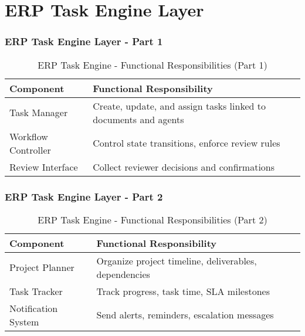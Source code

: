 \section{ERP Task Engine Layer}

\begin{frame}
    \frametitle{ERP Task Engine Layer - Part 1}
    \begin{table}[h!]
\centering
\renewcommand{\arraystretch}{1.2}
\begin{tabular}{|p{3cm}|p{7cm}|}
\hline
\textbf{Component} & \textbf{Functional Responsibility} \\
\hline
Task Manager & Create, update, and assign tasks linked to documents and agents \\
\hline
Workflow Controller & Control state transitions, enforce review rules \\
\hline
Review Interface & Collect reviewer decisions and confirmations \\
\hline
\end{tabular}
\caption{ERP Task Engine - Functional Responsibilities (Part 1)}
\end{table}
\end{frame}

\begin{frame}
    \frametitle{ERP Task Engine Layer - Part 2}
    \begin{table}[h!]
\centering
\renewcommand{\arraystretch}{1.2}
\begin{tabular}{|p{3cm}|p{7cm}|}
\hline
\textbf{Component} & \textbf{Functional Responsibility} \\
\hline
Project Planner & Organize project timeline, deliverables, dependencies \\
\hline
Task Tracker & Track progress, task time, SLA milestones \\
\hline
Notification System & Send alerts, reminders, escalation messages \\
\hline
\end{tabular}
\caption{ERP Task Engine - Functional Responsibilities (Part 2)}
\end{table}
\end{frame}


